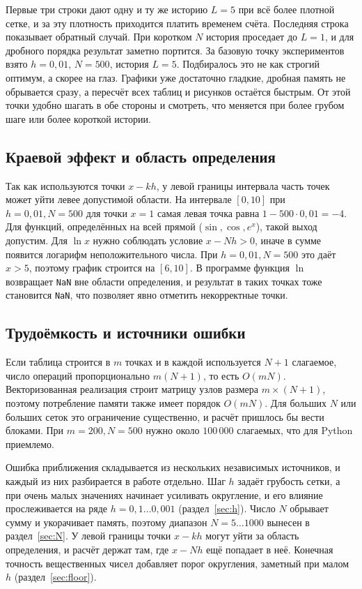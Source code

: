 \documentclass[14pt,a4paper]{extarticle}
\begin{document}
Первые три строки дают одну и ту же историю $L=5$ при всё более плотной сетке, и за эту плотность приходится платить временем счёта. Последняя строка показывает обратный случай. При коротком $N$ история проседает до $L=1$, и для дробного порядка результат заметно портится. За базовую точку экспериментов взято $h=0{,}01$, $N=500$, история $L=5$. Подбиралось это не как строгий оптимум, а скорее на глаз. Графики уже достаточно гладкие, дробная память не обрывается сразу, а пересчёт всех таблиц и рисунков остаётся быстрым. От этой точки удобно шагать в обе стороны и смотреть, что меняется при более грубом шаге или более короткой истории.

\subsection{Краевой эффект и область определения}

Так как используются точки $x-kh$, у левой границы интервала часть точек может уйти левее допустимой области. На интервале $[0,10]$ при $h=0{,}01,N=500$ для точки $x=1$ самая левая точка равна $1-500\cdot0{,}01=-4$. Для функций, определённых на всей прямой ($\sin,\cos,e^x$), такой выход допустим. Для $\ln x$ нужно соблюдать условие $x-Nh>0$, иначе в сумме появится логарифм неположительного числа. При $h=0{,}01,N=500$ это даёт $x>5$, поэтому график строится на $[6,10]$. В программе функция $\ln$ возвращает \texttt{NaN} вне области определения, и результат в таких точках тоже становится \texttt{NaN}, что позволяет явно отметить некорректные точки.

\subsection{Трудоёмкость и источники ошибки}

Если таблица строится в $m$ точках и в каждой используется $N+1$ слагаемое, число операций пропорционально $m(N+1)$, то есть $O(mN)$. Векторизованная реализация строит матрицу узлов размера $m\times(N+1)$, поэтому потребление памяти также имеет порядок $O(mN)$. Для больших $N$ или больших сеток это ограничение существенно, и расчёт пришлось бы вести блоками. При $m=200,N=500$ нужно около $100\,000$ слагаемых, что для Python приемлемо.

Ошибка приближения складывается из нескольких независимых источников, и каждый из них разбирается в работе отдельно. Шаг $h$ задаёт грубость сетки, а при очень малых значениях начинает усиливать округление, и его влияние прослеживается на ряде $h=0{,}1\dots0{,}001$ (раздел~\ref{sec:h}). Число $N$ обрывает сумму и укорачивает память, поэтому диапазон $N=5\dots1000$ вынесен в раздел~\ref{sec:N}. У левой границы точки $x-kh$ могут уйти за область определения, и расчёт держат там, где $x-Nh$ ещё попадает в неё. Конечная точность вещественных чисел добавляет порог округления, заметный при малом $h$ (раздел~\ref{sec:floor}).
\end{document}
